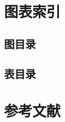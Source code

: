 \section{图表索引}
\subsection{图目录}
\subsection{表目录}
\newpage
\section{参考文献}
\printbibliography[heading=bibintoc]